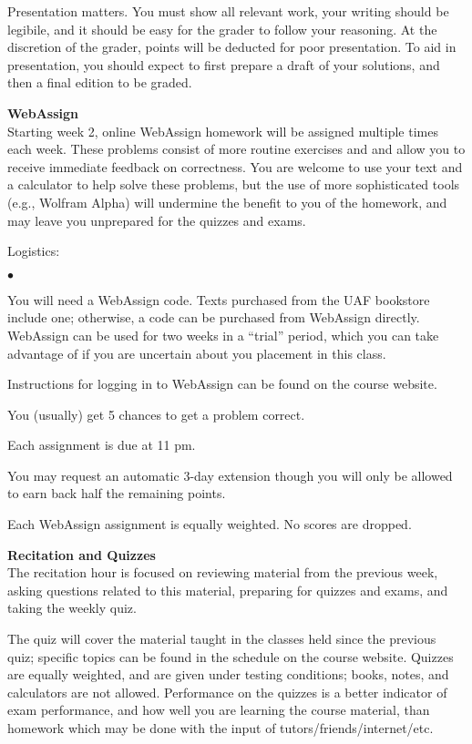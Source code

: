 \documentclass[12pt]{article}
\renewcommand{\emph}[1]{\textsf{\textbf{#1}}}
\newcommand{\localhead}[1]{\par\smallskip\textbf{#1}\nobreak\\}%
\def\heading#1{\localhead{\large\emph{#1}}}
\def\subheading#1{\localhead{\emph{#1}}}
\newenvironment{clist}%
{\bgroup\parskip 0pt\begin{list}{$\bullet$}{\partopsep 4pt\topsep 0pt\itemsep -2pt}}%
{\end{list}\egroup}%
\begin{document}
Presentation matters. You must show all relevant work, your writing
should be legibile, and it should be easy for the grader to follow
your reasoning. At the discretion of the grader, points will be deducted 
for poor presentation.  To aid in presentation, you should expect
to first prepare a draft of your solutions, and then a final edition to
be graded.

\subheading{WebAssign} 
Starting week 2, online WebAssign homework will be assigned multiple times each week. These problems consist of more routine exercises and and allow
you to receive immediate feedback on correctness.  You are welcome
to use your text and a calculator to help solve these problems, but
the use of more sophisticated tools (e.g., Wolfram Alpha) will undermine
the benefit to you of the homework, and may leave you unprepared for
the quizzes and exams.

Logistics:

\begin{clist}
\item You will need a WebAssign code.  Texts purchased from the UAF 
bookstore include one; otherwise, a code can be purchased from
WebAssign directly. WebAssign can be used for two weeks in a ``trial''
period, which you can take advantage of if you are uncertain about
you placement in this class.
\item Instructions for logging in to WebAssign can be found on the course website.
\item You (usually) get 5 chances to get a problem correct. 
\item Each assignment is due at 11 pm. 
\item You may request an automatic 3-day extension though you will only be allowed to earn back half the remaining points. 
\item Each WebAssign assignment is equally weighted. No scores are dropped.
\end{clist}

\heading{Recitation and Quizzes}
The recitation hour is focused on reviewing material from the previous week, asking questions related to this material, preparing for quizzes and exams, and taking the weekly quiz.

The quiz will cover the material taught in the classes held since the previous quiz; specific topics can be found in the schedule on the course website.  Quizzes are equally weighted, and are given under testing conditions; books, notes, and calculators are not allowed.  Performance on the quizzes is a better indicator of exam performance, and how well you are learning the course material, than homework which may be done with the input of tutors/friends/internet/etc.
\end{document}
